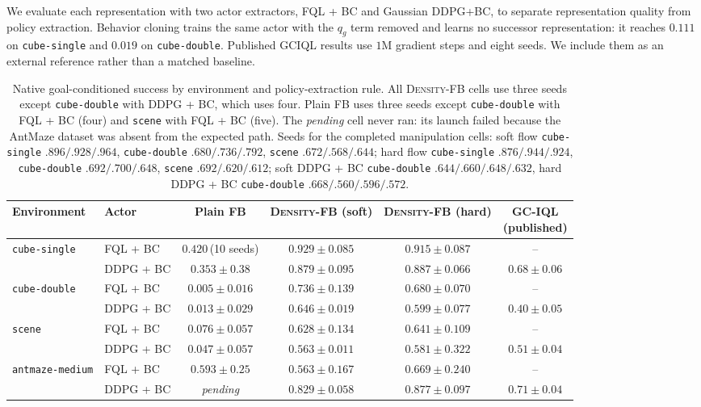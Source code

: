 \documentclass{article}
\newcommand{\DensityFB}{\textsc{Density-FB}}
\begin{document}
We evaluate each representation with two actor extractors, FQL + BC and Gaussian DDPG+BC, to separate representation quality from policy extraction.
Behavior cloning trains the same actor with the $q_g$ term removed and learns no successor representation: it reaches $0.111$ on \texttt{cube-single} and $0.019$ on \texttt{cube-double}.
Published GCIQL results use $1$M gradient steps and eight seeds.
We include them as an external reference rather than a matched baseline.

\begin{table}[h]
\centering
\small
\setlength{\tabcolsep}{3pt}
\begin{tabular}{llcccc}
\toprule
Environment & Actor & Plain FB & \DensityFB{} (soft) & \DensityFB{} (hard) & \shortstack{GC-IQL\\(published)} \\
\midrule
\texttt{cube-single}
& FQL + BC
& $0.420$\,(10 seeds)
& $\mathbf{0.929 \pm 0.085}$
& $0.915 \pm 0.087$
& -- \\

& DDPG + BC
& $0.353 \pm 0.38$
& $0.879 \pm 0.095$
& $0.887 \pm 0.066$
& $0.68 \pm 0.06$ \\
\midrule

\texttt{cube-double}
& FQL + BC
& $0.005 \pm 0.016$
& $\mathbf{0.736 \pm 0.139}$
& $0.680 \pm 0.070$
& -- \\

& DDPG + BC
& $0.013 \pm 0.029$
& $\mathbf{0.646 \pm 0.019}$
& $0.599 \pm 0.077$
& $0.40 \pm 0.05$ \\
\midrule

\texttt{scene}
& FQL + BC
& $0.076 \pm 0.057$
& $0.628 \pm 0.134$
& $\mathbf{0.641 \pm 0.109}$
& -- \\

& DDPG + BC
& $0.047 \pm 0.057$
& $0.563 \pm 0.011$
& $0.581 \pm 0.322$
& $0.51 \pm 0.04$ \\
\midrule

\texttt{antmaze-medium}
& FQL + BC
& $0.593 \pm 0.25$
& $0.563 \pm 0.167$
& $0.669 \pm 0.240$
& -- \\

& DDPG + BC
& \emph{pending}
& $0.829 \pm 0.058$
& $\mathbf{0.877 \pm 0.097}$
& $0.71 \pm 0.04$ \\
\bottomrule
\end{tabular}

\caption{
Native goal-conditioned success by environment and policy-extraction rule.
All \DensityFB{} cells use three seeds except \texttt{cube-double} with DDPG + BC, which uses four. Plain FB uses three seeds except \texttt{cube-double} with FQL + BC (four) and \texttt{scene} with FQL + BC (five). The \emph{pending} cell never ran: its launch failed because the AntMaze dataset was absent from the expected path.
Seeds for the completed manipulation cells:
soft flow \texttt{cube-single} $.896/.928/.964$,
\texttt{cube-double} $.680/.736/.792$,
\texttt{scene} $.672/.568/.644$;
hard flow \texttt{cube-single} $.876/.944/.924$,
\texttt{cube-double} $.692/.700/.648$,
\texttt{scene} $.692/.620/.612$;
soft DDPG + BC \texttt{cube-double} $.644/.660/.648/.632$,
hard DDPG + BC \texttt{cube-double} $.668/.560/.596/.572$.
}
\label{tab:main}
\end{table}
\end{document}
